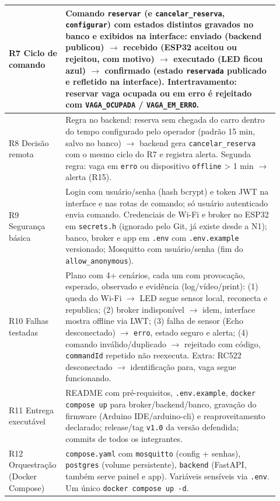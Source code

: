 \documentclass[11pt,a4paper]{article}
\newcommand{\cod}[1]{\texttt{#1}}
\begin{document}
\begin{longtable}{|p{0.15\linewidth}|p{0.77\linewidth}|}
R7 Ciclo de comando & Comando \cod{reservar} (e \cod{cancelar\_reserva}, \cod{configurar}) com estados distintos gravados no banco e exibidos na interface: \textbf{enviado} (backend publicou) $\rightarrow$ \textbf{recebido} (ESP32 aceitou ou rejeitou, com motivo) $\rightarrow$ \textbf{executado} (LED ficou azul) $\rightarrow$ \textbf{confirmado} (estado \cod{reservada} publicado e refletido na interface). Intertravamento: reservar vaga ocupada ou em erro é rejeitado com \cod{VAGA\_OCUPADA} / \cod{VAGA\_EM\_ERRO}. \\ \hline
R8 Decisão remota & Regra no backend: reserva sem chegada do carro dentro do tempo configurado pelo operador (padrão 15 min, salvo no banco) $\rightarrow$ backend gera \cod{cancelar\_reserva} com o mesmo ciclo do R7 e registra alerta. Segunda regra: vaga em \cod{erro} ou dispositivo \cod{offline} > 1 min $\rightarrow$ alerta (R15). \\ \hline
R9 Segurança básica & Login com usuário/senha (hash bcrypt) e token JWT na interface e nas rotas de comando; só usuário autenticado envia comando. Credenciais de Wi-Fi e broker no ESP32 em \cod{secrets.h} (ignorado pelo Git, já existe desde a N1); banco, broker e app em \cod{.env} com \cod{.env.example} versionado; Mosquitto com usuário/senha (fim do \cod{allow\_anonymous}). \\ \hline
R10 Falhas testadas & Plano com 4+ cenários, cada um com provocação, esperado, observado e evidência (log/vídeo/print): (1) queda do Wi-Fi $\rightarrow$ LED segue sensor local, reconecta e republica; (2) broker indisponível $\rightarrow$ idem, interface mostra offline via LWT; (3) falha de sensor (Echo desconectado) $\rightarrow$ \cod{erro}, estado seguro e alerta; (4) comando inválido/duplicado $\rightarrow$ rejeitado com código, \cod{commandId} repetido não reexecuta. Extra: RC522 desconectado $\rightarrow$ identificação para, vaga segue funcionando. \\ \hline
R11 Entrega executável & README com pré-requisitos, \cod{.env.example}, \cod{docker compose up} para broker/backend/banco, gravação do firmware (Arduino IDE/arduino-cli) e reaproveitamento declarado; release/tag \cod{v1.0} da versão defendida; commits de todos os integrantes. \\ \hline
R12 Orquestração (Docker Compose) & \cod{compose.yaml} com \cod{mosquitto} (config + senhas), \cod{postgres} (volume persistente), \cod{backend} (FastAPI, também serve painel e app). Variáveis sensíveis via \cod{.env}. Um único \cod{docker compose up -d}. \\ \hline

\end{longtable}
\end{document}
